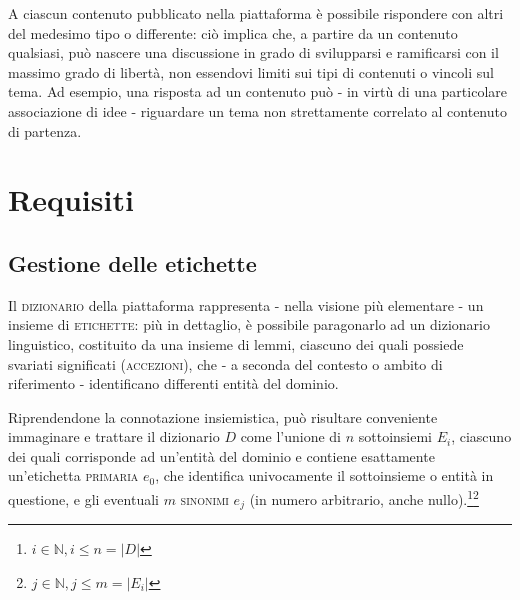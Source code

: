 \documentclass[10pt,a4paper,headinclude,footinclude,hidelinks]{scrreprt} %
\begin{document}
	A ciascun contenuto pubblicato nella piattaforma è possibile rispondere con altri del medesimo tipo o differente: ciò implica che, a partire da un contenuto qualsiasi, può nascere una discussione in grado di svilupparsi e ramificarsi con il massimo grado di libertà, non essendovi limiti sui tipi di contenuti o vincoli sul tema. Ad esempio, una risposta ad un contenuto può - in virtù di una particolare associazione di idee - riguardare un tema non strettamente correlato al contenuto di partenza.
	

	\chapter{Requisiti}
	\label{ch:stage:req}


	\section{Gestione delle etichette}
	\label{sec:stage:req:tag}
	
	Il \textsc{dizionario} della piattaforma rappresenta - nella visione più elementare - un insieme di \textsc{etichette}: più in dettaglio, è possibile paragonarlo ad un dizionario linguistico, costituito da una insieme di lemmi, ciascuno dei quali possiede svariati significati (\textsc{accezioni}), che - a seconda del contesto o ambito di riferimento - identificano differenti entità del dominio.

Riprendendone la connotazione insiemistica, può risultare conveniente immaginare e trattare il dizionario $D$ come l'unione di $n$ sottoinsiemi $E_i$, ciascuno dei quali corrisponde ad un'entità del dominio e contiene esattamente un'etichetta \textsc{primaria} $e_0$, che identifica univocamente il sottoinsieme o entità in questione, e gli eventuali $m$ \textsc{sinonimi} $e_j$ (in numero arbitrario, anche nullo).\footnote{$i \in \mathbb{N}, i \leq n=\left|D\right|$}\footnote{$j \in \mathbb{N}, j \leq m=\left|E_i\right|$}

\end{document}
